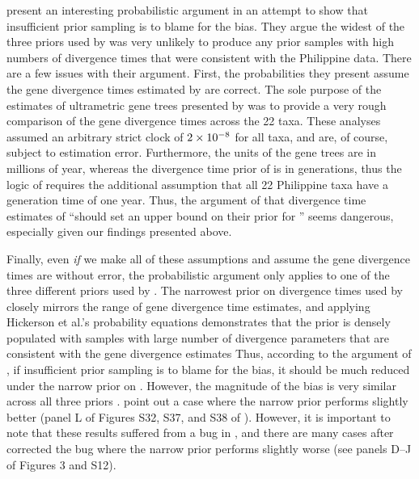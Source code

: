 \documentclass[letterpaper,12pt]{article}
\begin{document}
\begin{linenumbers}
\citet{Hickerson2013} present an interesting probabilistic argument in an
attempt to show that insufficient prior sampling is to blame for the bias.
They argue the widest of the three priors used by \citet{Oaks2012} was very
unlikely to produce any prior samples with high numbers of divergence times
that were consistent with the Philippine data.
There are a few issues with their argument.
First, the probabilities they present assume the gene divergence times
estimated by \citet{Oaks2012} are correct.
The sole purpose of the estimates of ultrametric gene trees presented by
\citet{Oaks2012} was to provide a very rough comparison of the gene divergence
times across the 22 taxa.  These analyses assumed an arbitrary strict clock of
$2\times 10^{-8}$ for all taxa, and are, of course, subject to estimation error.
Furthermore, the units of the gene trees are in millions of year, whereas the
divergence time prior of \msb is in generations, thus the logic of
\citet{Hickerson2013} requires the additional assumption that all 22 Philippine
taxa have a generation time of one year.
Thus, the argument of \citet{Hickerson2013} that divergence time estimates of
\citet{Oaks2012} ``should set an upper bound on their prior for \divt{}'' seems
dangerous, especially given our findings presented above.

Finally, even \emph{if} we make all of these assumptions and assume the
gene divergence times are without error, the probabilistic argument only
applies to one of the three different priors used by \citet{Oaks2012}.
The narrowest prior on divergence times used by \citet{Oaks2012} closely mirrors
the range of gene divergence time estimates, and applying Hickerson et al.'s
\citeyear{Hickerson2013} probability equations demonstrates that the prior
is densely populated with samples with large number of divergence parameters
that are consistent with the gene divergence estimates
Thus, according to the argument of \citet{Hickerson2013}, if insufficient prior
sampling is to blame for the bias, it should be much reduced under the narrow
prior on \divt{}.
However, the magnitude of the bias is very similar across all three priors
\citet{Oaks2012}.
\citet{Hickerson2013} point out a case where the narrow prior performs
slightly better (panel L of Figures S32, S37, and S38 of \citet{Oaks2012}).
However, it is important to note that these results suffered from a bug
in \msb, and there are many cases after \citet{Oaks2012} corrected the 
bug where the narrow prior performs slightly worse (see panels D--J of
Figures 3 and S12).


\end{linenumbers}
\end{document}
